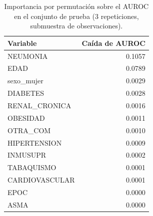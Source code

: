 
\begin{table}[htbp]
\centering
\small
\caption{Importancia por permutación sobre el AUROC en el conjunto de prueba
(3 repeticiones, submuestra de  observaciones).}
\label{tab:importancia}
\begin{tabular}{l r}
\toprule
Variable & Caída de AUROC \\
\midrule
NEUMONIA & 0.1057 \\
EDAD & 0.0789 \\
sexo\_mujer & 0.0029 \\
DIABETES & 0.0028 \\
RENAL\_CRONICA & 0.0016 \\
OBESIDAD & 0.0011 \\
OTRA\_COM & 0.0010 \\
HIPERTENSION & 0.0009 \\
INMUSUPR & 0.0002 \\
TABAQUISMO & 0.0001 \\
CARDIOVASCULAR & 0.0001 \\
EPOC & 0.0000 \\
ASMA & 0.0000 \\
\bottomrule
\end{tabular}
\end{table}
